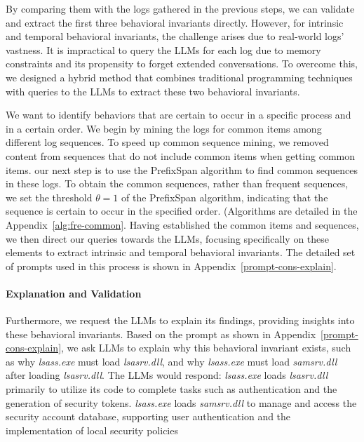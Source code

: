 By comparing them with the logs gathered in the previous steps, we can validate and extract the first three behavioral invariants directly.
However, for intrinsic and temporal behavioral invariants, the challenge arises due to real-world logs' vastness. It is impractical to query the LLMs for each log due to memory constraints and its propensity to forget extended conversations. To overcome this, we designed a hybrid method that combines traditional programming techniques with queries to the LLMs to extract these two behavioral invariants.

We want to identify behaviors that are certain to occur in a specific process and in a certain order. 
We begin by mining the logs for common items among different log sequences.   
To speed up common sequence mining, we removed content from sequences that do not include common items when getting common items.
our next step is to use the PrefixSpan algorithm to find common sequences in these logs. 
To obtain the common sequences, rather than frequent sequences, we set the threshold \( \theta =1\) of the PrefixSpan algorithm, indicating that the sequence is certain to occur in the specified order.
(Algorithms are detailed in the Appendix~\ref{alg:fre-common}.
Having established the common items and sequences, we then direct our queries towards the LLMs, focusing specifically on these elements to extract intrinsic and temporal behavioral invariants. 
The detailed set of prompts used in this process is shown in Appendix~\ref{prompt-cons-explain}.


\paragraph{Explanation and Validation}
Furthermore, we request the LLMs to explain its findings, providing insights into these behavioral invariants.
Based on the prompt as shown in Appendix~\ref{prompt-cons-explain}, we ask LLMs to explain why this behavioral invariant exists, such as why \textit{lsass.exe} must load \textit{lsasrv.dll}, and why \textit{lsass.exe} must load \textit{samsrv.dll} after loading \textit{lsasrv.dll}. 
The LLMs would respond: \textit{lsass.exe} loads \textit{lsasrv.dll} primarily to utilize its code to complete tasks such as authentication and the generation of security tokens. 
\textit{lsass.exe} loads \textit{samsrv.dll} to manage and access the security account database, supporting user authentication and the implementation of local security policies

